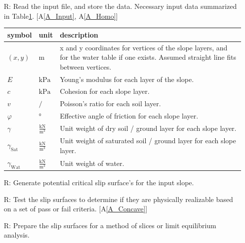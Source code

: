 \documentclass[12pt]{article}
\newcommand{\aref}[1]{A\ref{#1}}
\renewcommand{\arraystretch}{1}
\newcounter{reqnum} %
\newcounter{tablenum} %
\newcommand{\tableref}[1]{Table\ref{#1}}
\begin{document}
\noindent \begin{itemize}

\item[R\refstepcounter{reqnum}\thereqnum \label{R_Inputs}:] Read the
  input file, and store the data. Necessary input data summarized in
  \tableref{Table:Inputs}. [\aref{A_Input}, \aref{A_Homo}]
  
  \renewcommand{\arraystretch}{1.5}
  \noindent \begin{longtable}{l l p{12cm}} \toprule \textbf{symbol} &
    {tablenum}  \label{Table:Inputs}
    \textbf{unit} & \textbf{description}\\ \midrule
    $\left(x,y\right)$ & $\text{m}$ & x and y coordinates for vertices
    of the slope layers, and for the water table if one exists.
    Assumed straight line fits between vertices.\\
    $E$ & $\text{kPa}$ & Young's modulus for each layer of the
    slope.\\
    $c$ & $\text{kPa}$ & Cohesion for each slope layer. \\
    $v$ & $ / $ & Poisson's ratio for each soil layer. \\
    $\varphi$ & \si{\degree} & Effective angle of friction for each
    slope layer. \\
    $\gamma$ & $\frac{\text{kN}}{\text{m}^3}$ & Unit weight of dry
    soil / ground layer for each slope layer. \\
    $\gamma_{\text{Sat}}$ & $\frac{\text{kN}}{\text{m}^3}$ & Unit
    weight of saturated soil / ground layer for each slope
    layer. \\
    $\gamma_{\text{Wat}}$ & $\frac{\text{kN}}{\text{m}^3}$ & Unit
    weight of water. \\ \bottomrule
\end{longtable}

\item[R\refstepcounter{reqnum}\thereqnum \label{R_InitGen}:] Generate
  potential critical slip surface's for the input slope. 

\item[R\refstepcounter{reqnum}\thereqnum \label{R_KinAdm}:] Test the
  slip surfaces to determine if they are physically realizable based
  on a set of pass or fail criteria. [\aref{A_Concave}]

\item[R\refstepcounter{reqnum}\thereqnum \label{R_Slice}:] Prepare the
  slip surfaces for a method of slices or limit equilibrium analysis.


\end{itemize}
\end{document}
